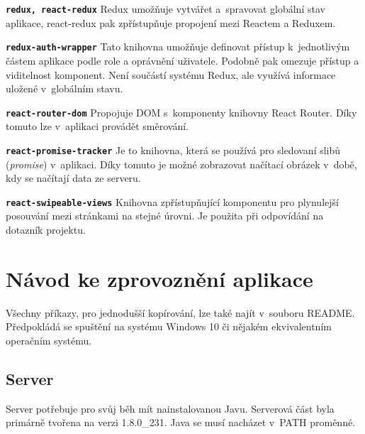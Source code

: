 \begin{DESCRIPTION}
\item \texttt{\textbf{redux, react-redux}} Redux umožňuje vytvářet a~spravovat globální stav aplikace, react-redux pak zpřístupňuje propojení mezi Reactem a Reduxem. 
\item \texttt{\textbf{redux-auth-wrapper}} Tato knihovna umožňuje definovat přístup k~jednotlivým částem aplikace podle role a oprávnění uživatele. Podobně pak omezuje přístup a viditelnost komponent. Není součástí systému Redux, ale využívá informace uložené v~globálním stavu. 
\item \texttt{\textbf{react-router-dom}} Propojuje DOM s~komponenty knihovny React Router. Díky tomuto lze v~aplikaci provádět směrování. 
\item \texttt{\textbf{react-promise-tracker}} Je to knihovna, která se používá pro sledovaní slibů (\textit{promise}) v~aplikaci. Díky tomuto je možné zobrazovat načítací obrázek v~době, kdy se načítají data ze serveru.
\item \texttt{\textbf{react-swipeable-views}} Knihovna zpřístupňující komponentu pro plynulejší posouvání mezi stránkami na stejné úrovni. Je použita při odpovídání na dotazník projektu.
\end{DESCRIPTION}

\chapter{Návod ke zprovoznění aplikace}
\label{prilohaNavod}

Všechny příkazy, pro jednodušší kopírování, lze také najít v~souboru README. Předpokládá se spuštění na systému Windows 10 či nějakém ekvivalentním operačním systému.

\section{Server}

Server potřebuje pro svůj běh mít nainstalovanou Javu. Serverová část byla primárně tvořena na verzi 1.8.0\_231. Java se musí nacházet v~PATH proměnné.

